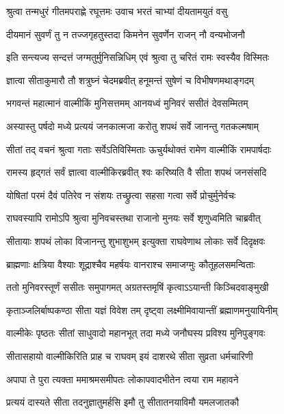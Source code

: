 \twolineshloka
{श्रुत्वा तन्मधुरं गीतमपराह्णे रघूत्तमः}
{उवाच भरतं चाभ्यां दीयतामयुतं वसु} %

\twolineshloka
{दीयमानं सुवर्णं तु न तज्जगृहतुस्तदा}
{किमनेन सुवर्णेन राजन् नौ वन्यभोजनौ} %

\twolineshloka
{इति सन्त्यज्य सन्दत्तं जग्मतुर्मुनिसन्निधिम्}
{एवं श्रुत्वा तु चरितं रामः स्वस्यैव विस्मितः} %

\twolineshloka
{ज्ञात्वा सीताकुमारौ तौ शत्रुघ्नं चेदमब्रवीत्}
{हनूमन्तं सुषेणं च विभीषणमथाङ्गदम्} %

\twolineshloka
{भगवन्तं महात्मानं वाल्मीकिं मुनिसत्तमम्}
{आनयध्वं मुनिवरं ससीतं देवसम्मितम्} %

\twolineshloka
{अस्यास्तु पर्षदो मध्ये प्रत्ययं जनकात्मजा}
{करोतु शपथं सर्वे जानन्तु गतकल्मषाम्} %

\twolineshloka
{सीतां तद् वचनं श्रुत्वा गताः सर्वेऽतिविस्मिताः}
{ऊचुर्यथोक्तं रामेण वाल्मीकिं रामपार्षदाः} %

\twolineshloka
{रामस्य हृद्गतं सर्वं ज्ञात्वा वाल्मीकिरब्रवीत्}
{श्वः करिष्यति वै सीता शपथं जनसंसदि} %

\twolineshloka
{योषितां परमं दैवं पतिरेव न संशयः}
{तच्छ्रुत्वा सहसा गत्वा सर्वे प्रोचुर्मुनेर्वचः} %

\twolineshloka
{राघवस्यापि रामोऽपि श्रुत्वा मुनिवचस्तथा}
{राजानो मुनयः सर्वे शृणुध्वमिति चाब्रवीत्} %

\twolineshloka
{सीतायाः शपथं लोका विजानन्तु शुभाशुभम्}
{इत्युक्ता राघवेणाथ लोकाः सर्वे दिदृक्षवः} %

\twolineshloka
{ब्राह्मणाः क्षत्रिया वैश्याः शूद्राश्चैव महर्षयः}
{वानराश्च समाजग्मुः कौतूहलसमन्विताः} %

\twolineshloka
{ततो मुनिवरस्तूर्णं ससीतः समुपागमत्}
{अग्रतस्तमृषिं कृत्वाऽऽयान्ती किञ्चिदवाङ्मुखी} %

\twolineshloka
{कृताञ्जलिर्बाष्पकण्ठा सीता यज्ञं विवेश तम्}
{दृष्ट्वा लक्ष्मीमिवायान्तीं ब्रह्माणमनुयायिनीम्} %

\twolineshloka
{वाल्मीकेः पृष्ठतः सीतां साधुवादो महानभूत्}
{तदा मध्ये जनौघस्य प्रविश्य मुनिपुङ्गवः} %

\twolineshloka
{सीतासहायो वाल्मीकिरिति प्राह च राघवम्}
{इयं दाशरथे सीता सुव्रता धर्मचारिणी} %

\twolineshloka
{अपापा ते पुरा त्यक्ता ममाश्रमसमीपतः}
{लोकापवादभीतेन त्वया राम महावने} %

\twolineshloka
{प्रत्ययं दास्यते सीता तदनुज्ञातुमर्हसि}
{इमौ तु सीतातनयाविमौ यमलजातकौ} %


